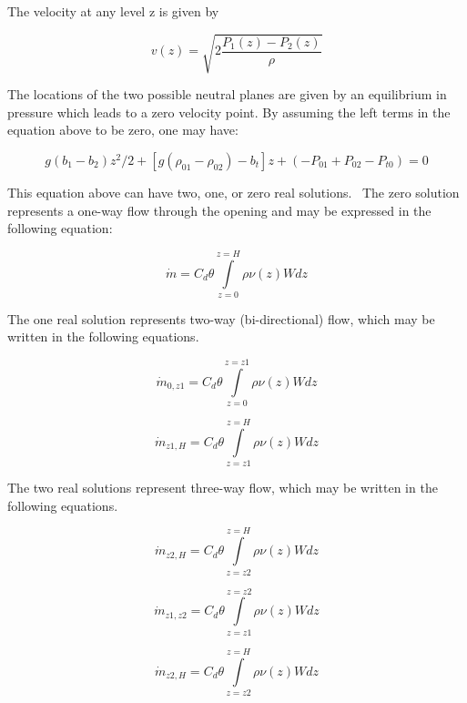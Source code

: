 The velocity at any level z is given by

\begin{equation}
v(z) = \sqrt {2\frac{{{P_1}(z) - {P_2}(z)}}{\rho }}
\end{equation}

The locations of the two possible neutral planes are given by an equilibrium in pressure which leads to a zero velocity point. By assuming the left terms in the equation above to be zero, one may have:

\begin{equation}
g({b_1} - {b_2}){z^2}/2 + \left[ {g({\rho_{01}} - {\rho_{02}}) - {b_t}} \right]z + ( - {P_{01}} + {P_{02}} - {P_{t0}}) = 0
\end{equation}

This equation above can have two, one, or zero real solutions.~ The zero solution represents a one-way flow through the opening and may be expressed in the following equation:

\begin{equation}
\dot m = {C_d}\theta \int\limits_{z = 0}^{z = H} {\rho \nu (z)Wdz}
\end{equation}

The one real solution represents two-way (bi-directional) flow, which may be written in the following equations.

\begin{equation}
{\dot m_{0,z1}} = {C_d}\theta \int\limits_{z = 0}^{z = z1} {\rho \nu (z)Wdz}
\end{equation}

\begin{equation}
{\dot m_{z1,H}} = {C_d}\theta \int\limits_{z = z1}^{z = H} {\rho \nu (z)Wdz}
\end{equation}

The two real solutions represent three-way flow, which may be written in the following equations.

\begin{equation}
{\dot m_{z2,H}} = {C_d}\theta \int\limits_{z = z2}^{z = H} {\rho \nu (z)Wdz}
\end{equation}

\begin{equation}
{\dot m_{z1,z2}} = {C_d}\theta \int\limits_{z = z1}^{z = z2} {\rho \nu (z)Wdz}
\end{equation}

\begin{equation}
{\dot m_{z2,H}} = {C_d}\theta \int\limits_{z = z2}^{z = H} {\rho \nu (z)Wdz}
\end{equation}

